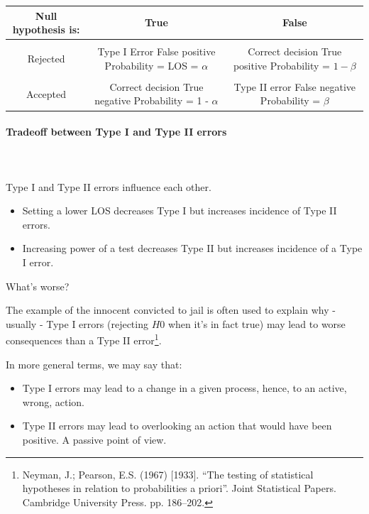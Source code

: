 \documentclass{article}
\begin{document}
\begin{center}
\begin{tabular}{|c|c|c|}
\hline
Null hypothesis is: & True & False \\ \hline
&&\\[-1em]
Rejected & \makecell {Type I Error \\ False positive \\ Probability = LOS = $\alpha$} & \makecell {Correct decision \\ True positive \\ Probability = $1-\beta$} \\ \hline
&&\\[-1em]
Accepted & \makecell {Correct decision \\ True negative \\ Probability = 1 - $\alpha$ } & \makecell{Type II error \\ False negative \\ Probability = $\beta$} \\
\hline
\end{tabular}
\end{center}

\paragraph{Tradeoff between Type I and Type II errors}\mbox{} \\
\mbox{} \\
Type I and Type II errors influence each other.
\begin{itemize}
    \item Setting a lower LOS decreases Type I but increases incidence of Type II errors.
    \item Increasing power of a test decreases Type II but increases incidence of a Type I error.
\end{itemize}

What’s worse?

The example of the innocent convicted to jail is often used to explain why - usually - Type I errors (rejecting $H0$ when it’s in fact true) may lead to worse consequences than a Type II error\footnote{Neyman, J.; Pearson, E.S. (1967) [1933]. “The testing of statistical hypotheses in relation to probabilities a priori”. Joint Statistical Papers. Cambridge University Press. pp. 186–202.}.

In more general terms, we may say that: 
\begin{itemize}
    \item Type I errors may lead to a change in a given process, hence, to an active, wrong, action.
    \item Type II errors may lead to overlooking an action that would have been positive. A passive point of view.
\end{itemize}
\end{document}
